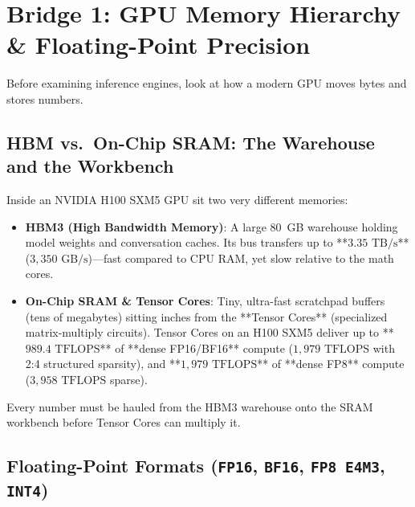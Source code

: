 \section{Bridge 1: GPU Memory Hierarchy \& Floating-Point Precision}

Before examining inference engines, look at how a modern GPU moves bytes and stores numbers.

\subsection{HBM vs.\ On-Chip SRAM: The Warehouse and the Workbench}

Inside an NVIDIA H100 SXM5 GPU sit two very different memories:
\begin{itemize}[leftmargin=18pt]
  \item \textbf{HBM3 (High Bandwidth Memory)}: A large 80~GB warehouse holding model weights and conversation caches. Its bus transfers up to **$3.35\text{ TB/s}$** ($3,350\text{ GB/s}$)---fast compared to CPU RAM, yet slow relative to the math cores.
  \item \textbf{On-Chip SRAM \& Tensor Cores}: Tiny, ultra-fast scratchpad buffers (tens of megabytes) sitting inches from the **Tensor Cores** (specialized matrix-multiply circuits). Tensor Cores on an H100 SXM5 deliver up to **$989.4\text{ TFLOPS}$** of **dense FP16/BF16** compute ($1,979\text{ TFLOPS}$ with 2:4 structured sparsity), and **$1,979\text{ TFLOPS}$** of **dense FP8** compute ($3,958\text{ TFLOPS}$ sparse).
\end{itemize}
Every number must be hauled from the HBM3 warehouse onto the SRAM workbench before Tensor Cores can multiply it.

\subsection{Floating-Point Formats (\texttt{FP16}, \texttt{BF16}, \texttt{FP8 E4M3}, \texttt{INT4})}


